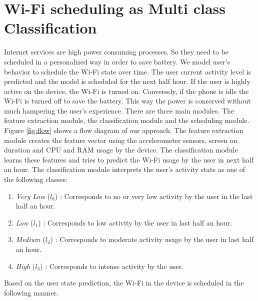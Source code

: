 \section{Wi-Fi scheduling as Multi class Classification}
Internet services are high power consuming processes. So they need to be scheduled in a personalized way in order to save battery. We model user’s behavior to schedule the Wi-Fi
state over time. The user current activity level is predicted and the
model is scheduled for the next half hour. If the user is highly
active on the device, the Wi-Fi is turned on. Conversely, if
the phone is idle the Wi-Fi is turned off to save the battery.
This way the power is conserved without much hampering the
user’s experience. There are three main modules. The
feature extraction module, the classification module and the
scheduling module. Figure \ref{fig:flow} shows a flow diagram of
our approach. %
The feature extraction module creates the feature vector using the accelerometer sensors, screen on duration and CPU and RAM usage by the device. The classification module learns these features and tries to predict the Wi-Fi usage by the user in next half an hour.
The classification module interprets the user's activity state as one of the following classes:

\begin{enumerate}
\item  {\em Very Low} ($l_0$) : Corresponds to no or very low activity by the user in the
last half an hour.
\item {\em Low} ($l_1$) : Corresponds to low activity  by the user
in last half an hour.
\item {\em Medium} ($l_2$) : Corresponds to moderate activity usage by the
user in last half an hour.
\item {\em High} ($l_3$) : Corresponds to intense activity  by the user.
\end{enumerate}

Based on the user state prediction, the Wi-Fi in the device is scheduled in the following manner.


